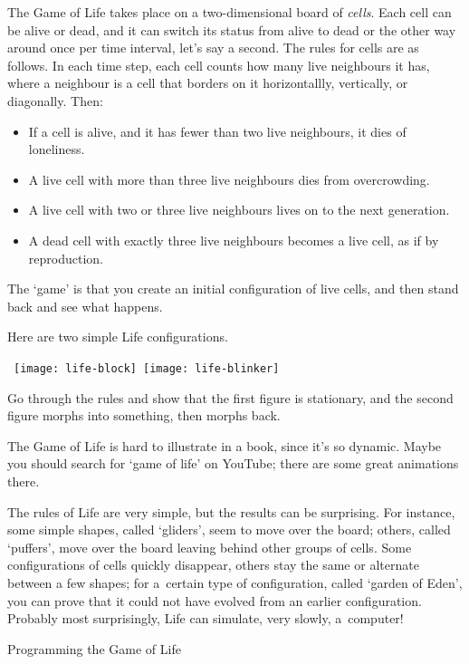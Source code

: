 The Game of Life takes place on
a two-dimensional board of \emph{cells}. Each cell can be
alive or dead, and it can switch its status from alive to dead
or the other way around once per time interval, let's say a second.
The rules for cells are as follows. In each time step, each cell
counts how many live neighbours it has, where a neighbour is a cell
that borders on it horizontallly, vertically, or diagonally. Then:
\begin{itemize}
\item If a cell is alive, and it has fewer than two live neighbours, it dies of loneliness.
\item A live cell with more than three live neighbours dies from overcrowding.
\item A live cell with two or three live neighbours lives on to the next generation.
\item A dead cell with exactly three live neighbours becomes a live cell, as if by reproduction.
\end{itemize}
The `game' is that you create an initial configuration of live cells, and then
stand back and see what happens. 
\begin{exercise}
  Here are two simple Life configurations.

  \ \hbox{\texttt{[image: life-block]} \texttt{[image: life-blinker]}}
  
  Go through the rules and show that the first figure is stationary,
  and the second figure morphs into something, then morphs back.
\end{exercise}
The Game of Life is hard to illustrate in a book, since it's so dynamic.
Maybe you should search for `game of life' on YouTube; there are some
great animations there.

The rules of Life are very simple, but the results can be surprising. For
instance, some simple shapes, called `gliders', seem to move over the
board; others, called `puffers', move over the board leaving behind
other groups of cells. Some configurations of cells quickly disappear,
others stay the same or alternate between a few shapes; for a~certain
type of configuration, called `garden of Eden', you can prove that it
could not have evolved from an earlier configuration. Probably most
surprisingly, Life can simulate, very slowly, a~computer!

 {Programming the Game of Life}


